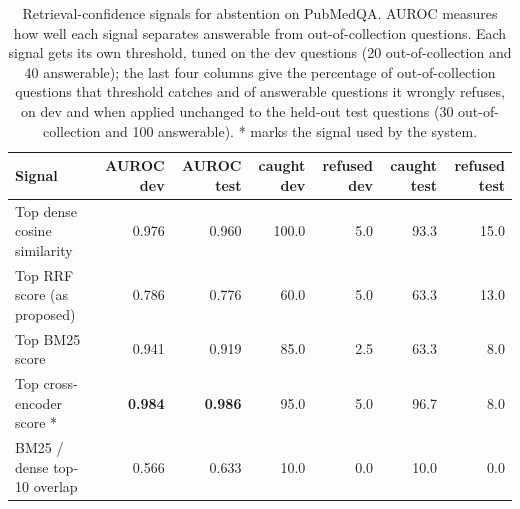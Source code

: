 \begin{table}[t]
\centering\small
\begin{tabular}{lrrrrrr}
\toprule
Signal & AUROC dev & AUROC test & caught dev & refused dev & caught test & refused test \\
\midrule
Top dense cosine similarity & 0.976 & 0.960 & 100.0 & 5.0 & 93.3 & 15.0 \\
Top RRF score (as proposed) & 0.786 & 0.776 & 60.0 & 5.0 & 63.3 & 13.0 \\
Top BM25 score & 0.941 & 0.919 & 85.0 & 2.5 & 63.3 & 8.0 \\
Top cross-encoder score * & \textbf{0.984} & \textbf{0.986} & 95.0 & 5.0 & 96.7 & 8.0 \\
BM25 / dense top-10 overlap & 0.566 & 0.633 & 10.0 & 0.0 & 10.0 & 0.0 \\
\bottomrule
\end{tabular}
\caption{Retrieval-confidence signals for abstention on PubMedQA. AUROC measures how well each signal separates answerable from out-of-collection questions. Each signal gets its own threshold, tuned on the dev questions (20 out-of-collection and 40 answerable); the last four columns give the percentage of out-of-collection questions that threshold catches and of answerable questions it wrongly refuses, on dev and when applied unchanged to the held-out test questions (30 out-of-collection and 100 answerable). * marks the signal used by the system.}
\label{tab:signals}
\end{table}

